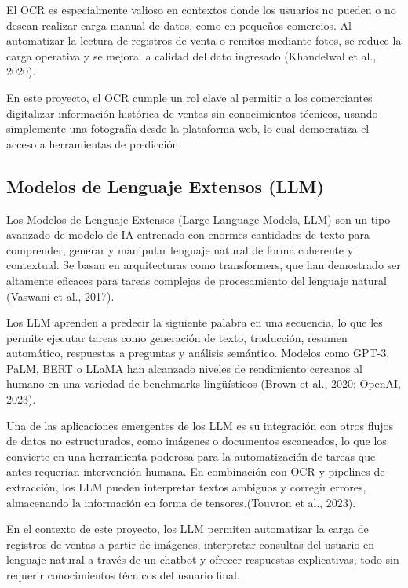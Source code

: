 \indent El OCR es especialmente valioso en contextos donde los usuarios no pueden o no desean realizar carga manual de datos, como en pequeños comercios. Al automatizar la lectura de registros de venta o remitos mediante fotos, se reduce la carga operativa y se mejora la calidad del dato ingresado (Khandelwal et al., 2020).

\indent En este proyecto, el OCR cumple un rol clave al permitir a los comerciantes digitalizar información histórica de ventas sin conocimientos técnicos, usando simplemente una fotografía desde la plataforma web, lo cual democratiza el acceso a herramientas de predicción.


\subsection{Modelos de Lenguaje Extensos (LLM)}

\indent Los Modelos de Lenguaje Extensos (Large Language Models, LLM) son un tipo avanzado de modelo de IA entrenado con enormes cantidades de texto para comprender, generar y manipular lenguaje natural de forma coherente y contextual. Se basan en arquitecturas como transformers, que han demostrado ser altamente eficaces para tareas complejas de procesamiento del lenguaje natural (Vaswani et al., 2017).

\indent Los LLM aprenden a predecir la siguiente palabra en una secuencia, lo que les permite ejecutar tareas como generación de texto, traducción, resumen automático, respuestas a preguntas y análisis semántico. Modelos como GPT-3, PaLM, BERT o LLaMA han alcanzado niveles de rendimiento cercanos al humano en una variedad de benchmarks lingüísticos (Brown et al., 2020; OpenAI, 2023).

\indent Una de las aplicaciones emergentes de los LLM es su integración con otros flujos de datos no estructurados, como imágenes o documentos escaneados, lo que los convierte en una herramienta poderosa para la automatización de tareas que antes requerían intervención humana. En combinación con OCR y pipelines de extracción, los LLM pueden interpretar textos ambiguos y corregir errores, almacenando la información en forma de tensores.(Touvron et al., 2023).

\indent En el contexto de este proyecto, los LLM permiten automatizar la carga de registros de ventas a partir de imágenes, interpretar consultas del usuario en lenguaje natural a través de un chatbot y ofrecer respuestas explicativas, todo sin requerir conocimientos técnicos del usuario final.

